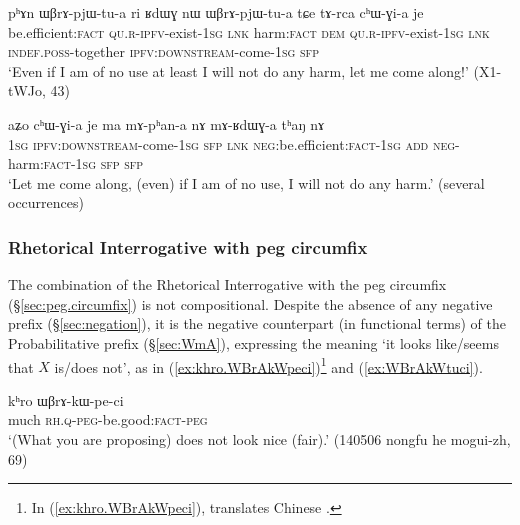  \begin{exe}
\ex \label{ex:WBrApjWtua}
\gll   pʰɤn ɯβrɤ-pjɯ-tu-a ri ʁdɯɣ nɯ ɯβrɤ-pjɯ-tu-a tɕe tɤ-rca cʰɯ-ɣi-a je \\
be.efficient:\textsc{fact} \textsc{qu}.\textsc{r}-\textsc{ipfv}-exist-\textsc{1sg} \textsc{lnk} harm:\textsc{fact} \textsc{dem} \textsc{qu}.\textsc{r}-\textsc{ipfv}-exist-\textsc{1sg}  \textsc{lnk} \textsc{indef}.\textsc{poss}-together \textsc{ipfv}:\textsc{downstream}-come-\textsc{1sg} \textsc{sfp} \\
\glt `Even if I am of no use at least I will not do any harm, let me come along!' (X1-tWJo, 43)
\end{exe}

 \begin{exe}
\ex \label{ex:mAphana.mARdWGa}
\gll  aʑo cʰɯ-ɣi-a je ma mɤ-pʰan-a nɤ mɤ-ʁdɯɣ-a tʰaŋ nɤ \\
\textsc{1sg} \textsc{ipfv}:\textsc{downstream}-come-\textsc{1sg} \textsc{sfp} \textsc{lnk} \textsc{neg}:be.efficient:\textsc{fact}-\textsc{1sg} \textsc{add} \textsc{neg}-harm:\textsc{fact}-\textsc{1sg} \textsc{sfp} \textsc{sfp} \\
\glt `Let me come along, (even) if I am of no use, I will not do any harm.' (several occurrences)
\end{exe}

\subsubsection{Rhetorical Interrogative with peg circumfix} \label{sec:WBrA.kW.ci}
The combination of the Rhetorical Interrogative with the peg circumfix (§\ref{sec:peg.circumfix}) is not compositional. Despite the absence of any negative prefix (§\ref{sec:negation}), it is the negative counterpart (in functional terms) of the Probabilitative prefix (§\ref{sec:WmA}), expressing the meaning `it looks like/seems that $X$ is/does not', as in (\ref{ex:khro.WBrAkWpeci})\footnote{In (\ref{ex:khro.WBrAkWpeci}),  translates Chinese . } and (\ref{ex:WBrAkWtuci}).


\begin{exe}
\ex \label{ex:khro.WBrAkWpeci}
 \gll kʰro ɯβrɤ-kɯ-pe-ci \\
 much \textsc{rh}.\textsc{q}-\textsc{peg}-be.good:\textsc{fact}-\textsc{peg} \\
\glt `(What you are proposing) does not look nice (fair).' (140506 nongfu he mogui-zh, 69)
\end{exe}

